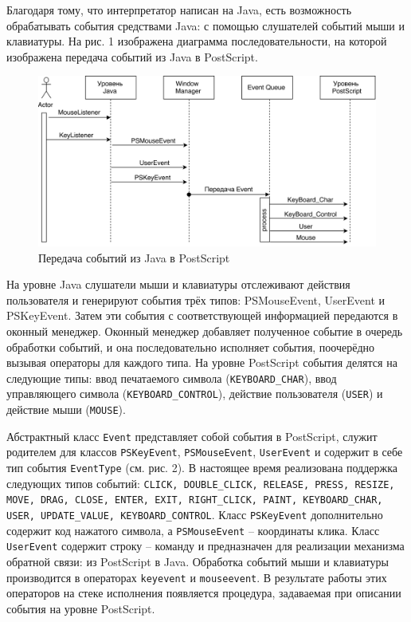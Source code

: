 \documentclass[14pt]{matmex-diploma}
\begin{document}
Благодаря тому, что интерпретатор написан на Java, есть возможность обрабатывать события средствами Java: с помощью слушателей событий мыши и клавиатуры. На рис. 1 изображена диаграмма последовательности, на которой изображена передача событий из Java в PostScript.

\begin{figure}[h!]
\label{разрыв_функции}
\centering
\includegraphics[width=\linewidth,keepaspectratio]{Java_to_PostScript.png}
\caption{Передача событий из Java в PostScript}
\end{figure}


На уровне Java слушатели мыши и клавиатуры отслеживают действия пользователя и генерируют события трёх типов: PSMouseEvent, UserEvent и PSKeyEvent. Затем эти события с соответствующей информацией передаются в оконный менеджер. Оконный менеджер добавляет полученное событие в очередь обработки событий, и она последовательно исполняет события, поочерёдно вызывая операторы для каждого типа. На уровне PostScript события делятся на следующие типы: ввод печатаемого символа  (\texttt{KEYBOARD\_CHAR}), ввод управляющего символа (\texttt{KEYBOARD\_CONTROL}), действие пользователя (\texttt{USER}) и действие мыши (\texttt{MOUSE}).

Абстрактный класс \texttt{Event} представляет собой события в PostScript, служит родителем для классов \texttt{PSKeyEvent}, \texttt{PSMouseEvent}, \texttt{UserEvent} и содержит в себе тип события \texttt{EventType} (см. рис. 2). В настоящее время реализована поддержка следующих типов событий: \texttt{CLICK, DOUBLE\_CLICK, RELEASE, PRESS, RESIZE, MOVE, DRAG, CLOSE, ENTER, EXIT, RIGHT\_CLICK, PAINT, KEYBOARD\_CHAR, USER, UPDATE\_VALUE, KEYBOARD\_CONTROL}. Класс \texttt{PSKeyEvent} дополнительно содержит код нажатого символа, а \texttt{PSMouseEvent} -- координаты клика. Класс \texttt{UserEvent} содержит строку -- команду и предназначен для реализации механизма обратной связи: из PostScript в Java.  Обработка событий мыши и клавиатуры производится в операторах \texttt{keyevent} и \texttt{mouseevent}. В результате работы этих операторов на стеке исполнения появляется процедура, задаваемая при описании события на уровне PostScript.
\end{document}
